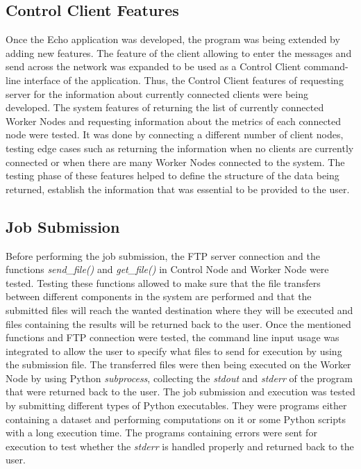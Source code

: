 \documentclass[10pt]{report}
\begin{document}
\subsection*{Control Client Features}
Once the Echo application was developed, the program was being extended by adding new features. The feature of the client allowing to enter the messages and send across the network was expanded to be used as a Control Client command-line interface of the application. Thus, the Control Client features of requesting server for the information about currently connected clients were being developed. The system features of returning the list of currently connected Worker Nodes and requesting information about the metrics of each connected node were tested. It was done by connecting a different number of client nodes, testing edge cases such as returning the information when no clients are currently connected or when there are many Worker Nodes connected to the system. The testing phase of these features helped to define the structure of the data being returned, establish the information that was essential to be provided to the user.

\subsection*{Job Submission}
Before performing the job submission, the FTP server connection and the functions \textit{send\_file()} and \textit{get\_file()} in Control Node and Worker Node were tested. Testing these functions allowed to make sure that the file transfers between different components in the system are performed and that the submitted files will reach the wanted destination where they will be executed and files containing the results will be returned back to the user. Once the mentioned functions and FTP connection were tested, the command line input usage was integrated to allow the user to specify what files to send for execution by using the submission file. The transferred files were then being executed on the Worker Node by using Python \textit{subprocess}, collecting the \textit{stdout} and \textit{stderr} of the program that were returned back to the user. The job submission and execution was tested by submitting different types of Python executables. They were programs either containing a dataset and performing computations on it or some Python scripts with a long execution time. The programs containing errors were sent for execution to test whether the \textit{stderr} is handled properly and returned back to the user.
\end{document}
